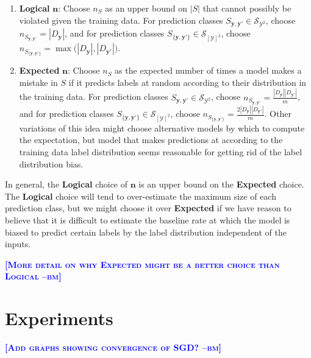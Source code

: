 \documentclass{article} %
\newcommand{\bmcomment}[1]{\textcolor{blue}{\textsc{\textbf{[#1 --bm]}}}}
\begin{document}
\begin{enumerate}

\item \textbf{Logical} $\mathbf{n}$: Choose $n_S$ as an upper bound
on $|S|$ that cannot possibly be violated given the training data. 
For prediction classes 
$S_{\mathbf{y},\mathbf{y'}}\in\mathcal{S}_{\mathcal{Y}^2}$, 
choose $n_{S_{\mathbf{y},\mathbf{y'}}}=|D_\mathbf{y}|$, and for prediction 
classes 
$S_{\{\mathbf{y},\mathbf{y'}\}}\in\mathcal{S}_{[\mathcal{Y}]^2}$,
choose 
$n_{S_{\{\mathbf{y},\mathbf{y'}\}}}=
\max\big(|D_\mathbf{y}|,|D_\mathbf{y'}|\big)$.

\item \textbf{Expected} $\mathbf{n}$:  Choose $n_S$ as the expected
number of times a model makes a mistake in $S$ if it predicts labels
at random according to their distribution in the training data. 
For prediction classes 
$S_{\mathbf{y},\mathbf{y'}}\in\mathcal{S}_{\mathcal{Y}^2}$, 
choose $n_{S_{\mathbf{y},\mathbf{y'}}}=
\frac{|D_\mathbf{y}||D_\mathbf{y'}|}{m}$, 
and for prediction classes 
$S_{\{\mathbf{y},\mathbf{y'}\}}\in\mathcal{S}_{[\mathcal{Y}]^2}$,
choose 
$n_{S_{\{\mathbf{y},\mathbf{y'}\}}}=
\frac{2|D_\mathbf{y}||D_\mathbf{y'}|}{m}$.
Other variations of this idea might choose alternative models by which
to compute the expectation, but model that makes predictions at
according to the training data label distribution seems 
reasonable for getting rid of the label distribution bias.

\end{enumerate}

In general, the \textbf{Logical} choice of $\mathbf{n}$ is an upper
bound on the \textbf{Expected} choice.  The \textbf{Logical} choice
will tend to over-estimate the maximum size of each prediction class,
but we might choose it over \textbf{Expected} if we have reason
to believe that it is difficult to estimate the baseline rate at
which the model is biased to predict certain labels by the label
distribution independent of the inputs.

\bmcomment{More detail on why Expected might be a better 
choice than Logical}

\section{Experiments}

\bmcomment{Add graphs showing convergence of SGD?}
\end{document}
